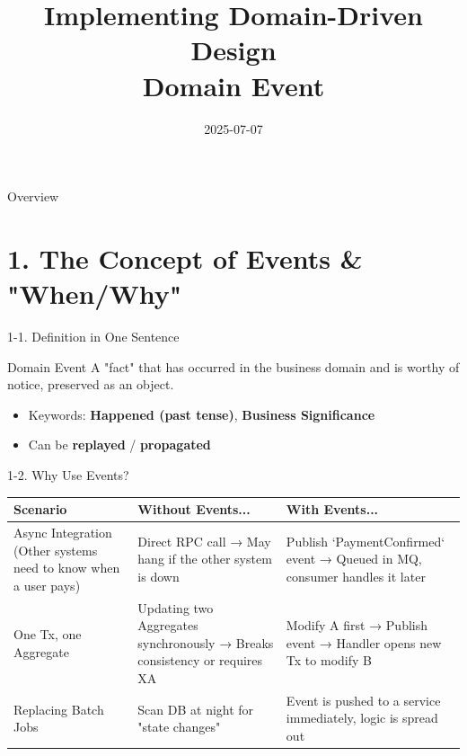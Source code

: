\documentclass{beamer}
\title[Domain Event]{Implementing Domain-Driven Design \\ Domain Event}
\begin{document}

\date{2025-07-07}

\begin{frame}
  \titlepage
\end{frame}

\begin{frame}{Overview}
    \scriptsize
    \tableofcontents[hideallsubsections]
\end{frame}

\section{1. The Concept of Events \& "When/Why"}

\begin{frame}{1-1. Definition in One Sentence}
  \begin{block}{Domain Event}
    A "fact" that has occurred in the business domain and is worthy of notice, preserved as an object.
  \end{block}

  \begin{itemize}
    \item<1-> Keywords: \textbf{Happened (past tense)}, \textbf{Business Significance}
    \item<2-> Can be \textbf{replayed} / \textbf{propagated}
  \end{itemize}
\end{frame}

\begin{frame}{1-2. Why Use Events?}
  \tiny
  \begin{tabular}{|p{2.5cm}|p{4cm}|p{4cm}|}
    \hline
    \textbf{Scenario} & \textbf{Without Events...} & \textbf{With Events...} \\
    \hline
    Async Integration (Other systems need to know when a user pays) & Direct RPC call → May hang if the other system is down & Publish `PaymentConfirmed` event → Queued in MQ, consumer handles it later \\
    \hline
    One Tx, one Aggregate & Updating two Aggregates synchronously → Breaks consistency or requires XA & Modify A first → Publish event → Handler opens new Tx to modify B \\
    \hline
    Replacing Batch Jobs & Scan DB at night for "state changes" & Event is pushed to a service immediately, logic is spread out \\
    \hline
  \end{tabular}
\end{frame}
\end{document}
